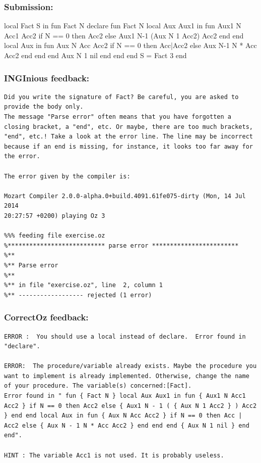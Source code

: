 \documentclass[11pt,a4paper,twoside,openright]{report}
\begin{document}
\subsubsection*{Submission:}
\begin{OZ}
  local Fact S in 
    fun {Fact N}
      declare
      fun {Fact N}
        local Aux Aux1 in
          fun {Aux1 N Acc1 Acc2}
            if N == 0 then Acc2
            else {Aux1 N-1 ({Aux N 1 Acc2}) Acc2 } end
          end
          local Aux in
            fun {Aux N Acc Acc2}
              if N == 0 then Acc|Acc2
              else {Aux N-1 N * Acc Acc2} end
            end
          end
          {Aux N 1 nil}
        end
      end
    end
    S = {Fact 3}
  end
\end{OZ}

\subsubsection*{INGInious feedback:}
\begin{lstlisting}
Did you write the signature of Fact? Be careful, you are asked to provide the body only.
The message "Parse error" often means that you have forgotten a closing bracket, a "end", etc. Or maybe, there are too much brackets, "end", etc.! Take a look at the error line. The line may be incorrect because if an end is missing, for instance, it looks too far away for the error.

The error given by the compiler is:

Mozart Compiler 2.0.0-alpha.0+build.4091.61fe075-dirty (Mon, 14 Jul 2014 
20:27:57 +0200) playing Oz 3

%%% feeding file exercise.oz
%*************************** parse error ************************
%**
%** Parse error
%**
%** in file "exercise.oz", line  2, column 1
%** ------------------ rejected (1 error)
\end{lstlisting}


\subsubsection*{CorrectOz feedback:}
\begin{lstlisting}
ERROR :  You should use a local instead of declare.  Error found in "declare".

ERROR:  The procedure/variable already exists. Maybe the procedure you want to implement is already implemented. Otherwise, change the name of your procedure. The variable(s) concerned:[Fact]. 
Error found in " fun { Fact N } local Aux Aux1 in fun { Aux1 N Acc1 Acc2 } if N == 0 then Acc2 else { Aux1 N - 1 ( { Aux N 1 Acc2 } ) Acc2 } end end local Aux in fun { Aux N Acc Acc2 } if N == 0 then Acc | Acc2 else { Aux N - 1 N * Acc Acc2 } end end end { Aux N 1 nil } end end".

HINT : The variable Acc1 is not used. It is probably useless.
\end{lstlisting}
\end{document}
